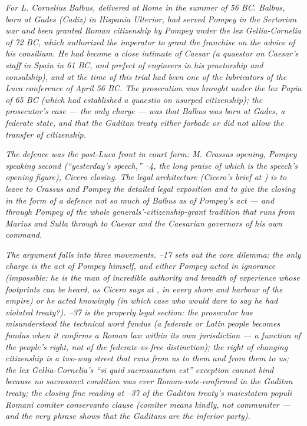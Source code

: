 
\textit{For L. Cornelius Balbus, delivered at Rome in the
summer of 56 BC. Balbus, born at Gades (Cadiz) in
Hispania Ulterior, had served Pompey in the Sertorian
war and been granted Roman citizenship by Pompey under
the lex Gellia-Cornelia of 72 BC, which authorized the
imperator to grant the franchise on the advice of his
consilium. He had become a close intimate of Caesar (a
quaestor on Caesar's staff in Spain in 61 BC, and prefect
of engineers in his praetorship and consulship), and at
the time of this trial had been one of the lubricators
of the Luca conference of April 56 BC. The prosecution
was brought under the lex Papia of 65 BC (which had
established a quaestio on usurped citizenship); the
prosecutor's case --- the only charge --- was that Balbus
was born at Gades, a federate state, and that the
Gaditan treaty either forbade or did not allow the
transfer of citizenship.}

\textit{The defence was the post-Luca front in court
form: M. Crassus opening, Pompey speaking second
(``yesterday's speech,'' --4, the long
praise of which is the speech's opening figure), Cicero
closing. The legal architecture (Cicero's brief at
) is to leave to Crassus and Pompey the
detailed legal exposition and to give the closing in
the form of a defence not so much of Balbus as of
Pompey's act --- and through Pompey of the whole
generals'-citizenship-grant tradition that runs from
Marius and Sulla through to Caesar and the Caesarian
governors of his own command.}

\textit{The argument falls into three movements.
--17 sets out the core dilemma: the only
charge is the act of Pompey himself, and either Pompey
acted in ignorance (impossible: he is the man of
incredible authority and breadth of experience whose
footprints can be heard, as Cicero says at , in every shore and harbour of the empire) or he
acted knowingly (in which case who would dare to say
he had violated treaty?). --37 is the
properly legal section: the prosecutor has misunderstood
the technical word \textit{fundus} (a federate or
Latin people becomes \textit{fundus} when it confirms a
Roman law within its own jurisdiction --- a function of
the people's right, not of the federate-vs-free
distinction); the right of changing citizenship is a
two-way street that runs from us to them and from them
to us; the lex Gellia-Cornelia's ``\textit{si quid
sacrosanctum est}'' exception cannot bind because no
sacrosanct condition was ever Roman-vote-confirmed in
the Gaditan treaty; the closing fine reading at
--37 of the Gaditan treaty's
\textit{maiestatem populi Romani comiter conservanto}
clause (\textit{comiter} means kindly, not communiter
--- and the very phrase shows that the Gaditans are the
inferior party).}

